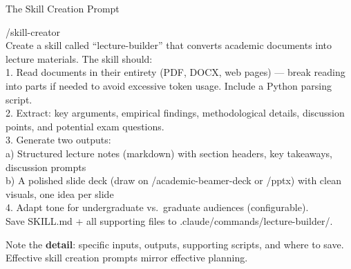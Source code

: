 \documentclass[aspectratio=169, 10pt]{beamer}
\begin{document}
\begin{frame}{The Skill Creation Prompt}
\begin{tcolorbox}[colback=DarkSlate, colframe=DarkSlate, arc=3pt, left=6pt, right=6pt, top=4pt, bottom=4pt]
{\color{CoolGray}\ttfamily\tiny /skill-creator\\[2pt]
\color{white}\tiny
Create a skill called ``lecture-builder'' that converts academic documents into lecture materials. The skill should:\\[1pt]
1. Read documents in their entirety (PDF, DOCX, web pages) --- break reading into parts if needed to avoid excessive token usage. Include a Python parsing script.\\[1pt]
2. Extract: key arguments, empirical findings, methodological details, discussion points, and potential exam questions.\\[1pt]
3. Generate two outputs:\\
\quad a) Structured lecture notes (markdown) with section headers, key takeaways, discussion prompts\\
\quad b) A polished slide deck (draw on /academic-beamer-deck or /pptx) with clean visuals, one idea per slide\\[1pt]
4. Adapt tone for undergraduate vs.\ graduate audiences (configurable).\\[1pt]
Save SKILL.md + all supporting files to .claude/commands/lecture-builder/.
}
\end{tcolorbox}
\vskip4pt
\begin{tcolorbox}[quotebox, width=11cm]
\scriptsize Note the \textbf{detail}: specific inputs, outputs, supporting scripts, and where to save. Effective skill creation prompts mirror effective planning.
\end{tcolorbox}
\end{frame}
\end{document}
